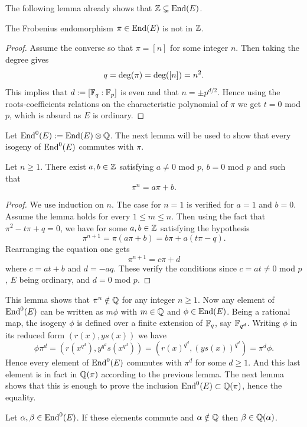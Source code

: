 \documentclass[../main/main.tex]{subfiles}
\begin{document}
The following lemma already shows that $\mathbb{Z}\subsetneq\text{End}(E)$.
\begin{lemma}
	The Frobenius endomorphism $\pi\in\text{End}(E)$ is not in $\mathbb{Z}$.
\end{lemma}
\begin{proof}
	Assume the converse so that $\pi = [n]$ for some integer $n$.
	Then taking the degree gives
	\[q=\text{deg}(\pi) = \text{deg}([n]) = n^2.\]
	This implies that $d :=[\mathbb{F}_q:\mathbb{F}_p]$ is even and that $n = \pm p^{d/2}$.
	Hence using the roots-coefficients relations on the characteristic polynomial of $\pi$ we get $t=0$ mod $p$, which is absurd as $E$ is ordinary.
\end{proof}
Let $\text{End}^0(E) := \text{End}(E)\otimes\mathbb{Q}$.
The next lemma will be used to show that every isogeny of $\text{End}^0(E)$ commutes with $\pi$.
\begin{lemma}
	Let $n\geq 1$. There exist $a, b\in\mathbb{Z}$ satisfying $a\neq 0$ mod $p$, $b = 0$ mod $p$ and such that
	\[
		\pi^n = a\pi + b.
	\]
\end{lemma}
\begin{proof}
	We use induction on $n$.
	The case for $n = 1$ is verified for $a = 1$ and $b=0$.
	Assume the lemma holds for every $1 \leq m \leq n$.
	Then using the fact that $\pi ^ 2 -t\pi + q = 0$,  we have for some $a,b\in\mathbb{Z}$ satisfying the hypothesis
	\[
		\pi^{n+1} = \pi(a\pi + b) = b\pi + a(t\pi-q).
	\]
	Rearranging the equation one gets
	\[
		\pi^{n+1} = c\pi + d
	\]
	where $c = at+b$ and $d=-aq$.
	These verify the conditions since $c = at\neq 0$ mod $p$, $E$ being ordinary,  and $d = 0$ mod $p$.
\end{proof}
This lemma shows that $\pi^n\notin\mathbb{Q}$ for any integer $n\geq 1$.
Now any element of $\text{End}^0(E)$ can be written as $m\phi$ with $m\in\mathbb{Q}$ and $\phi\in\text{End}(E)$.
Being a rational map, the isogeny $\phi$ is defined over a finite extension of $\mathbb{F}_q$, say $\mathbb{F}_{q^d}$.
Writing $\phi$ in its reduced form $(r(x), ys(x))$ we have
\[
	\phi\pi^d = (r(x^{q^d}), y^{q^d}s(x^{q^d})) = (r(x)^{q^d}, (ys(x))^{q^d}) = \pi^d\phi.
\]
Hence every element of $\text{End}^0(E)$ commutes with $\pi^d$ for some $d\geq 1$.
And this last element is in fact in $\mathbb{Q}(\pi)$ according to the previous lemma.
The next lemma shows that this is enough to prove the inclusion $\text{End}^0(E)\subset\mathbb{Q}(\pi)$, hence the equality.
\begin{lemma}
	Let $\alpha, \beta\in \text{End}^0(E)$. If these elements commute and $\alpha\notin\mathbb{Q}$ then $\beta\in\mathbb{Q}(\alpha)$.
\end{lemma}
\end{document}
